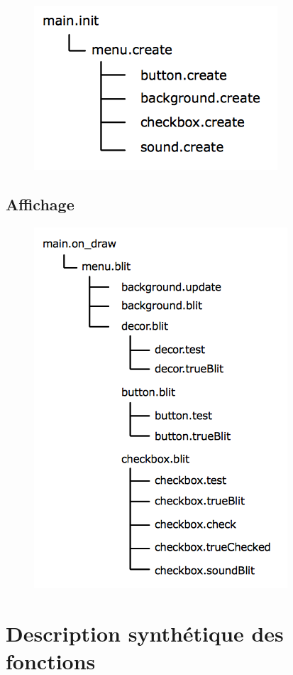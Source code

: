 \documentclass{article}
\begin{document}
\begin{center}
\begin{figure}[h]
\includegraphics[scale=0.5]{arbre_init.png}
\end{figure}
\end{center}

\subsection{Affichage}
\begin{figure}[h]
\includegraphics[scale=0.5]{arbre_ondraw.png}
\end{figure}
\newpage
\section{Description synthétique des fonctions}
\end{document}
